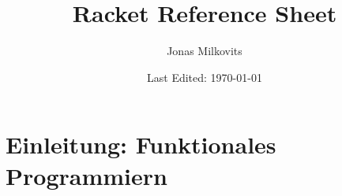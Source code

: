 

\usepackage{tuda-ci}

\renewcommand{\arraystretch}{1.75} 

\begin{titlepage}
  \title{Racket Reference Sheet} %
  \author{Jonas Milkovits}
  \date{Last Edited: \today}
\end{titlepage}



\maketitle
{} %
\tableofcontents
\clearpage
{} %

\section{Einleitung: Funktionales Programmiern}

